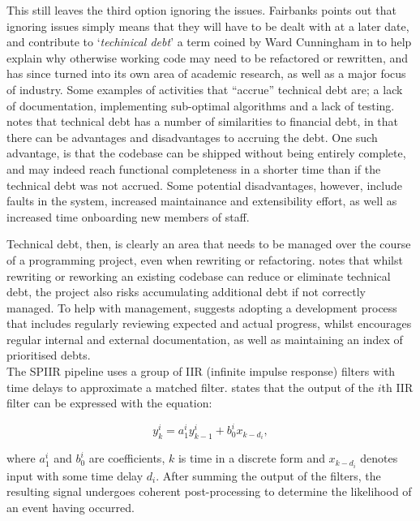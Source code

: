 \documentclass{article}
\begin{document}
This still leaves the third option \textendash{} ignoring the issues. Fairbanks points out that
ignoring issues simply means that they will have to be dealt with at a later date, and contribute to
`\textit{techinical debt}' \textendash{} a term coined by Ward Cunningham in \cite{Cunningham} to
help explain why otherwise working code may need to be refactored or rewritten, and has since turned
into its own area of academic research, as well as a major focus of industry. Some examples of
activities that ``accrue'' technical debt are; a lack of documentation, implementing sub-optimal
algorithms and a lack of testing. \cite{Allman} notes that technical debt has a number of
similarities to financial debt, in that there can be advantages and disadvantages to accruing the
debt. One such advantage, is that the codebase can be shipped without being entirely complete, and
may indeed reach functional completeness in a shorter time than if the technical debt was not
accrued. Some potential disadvantages, however, include faults in the system, increased maintainance
and extensibility effort, as well as increased time onboarding new members of staff.

Technical debt, then, is clearly an area that needs to be managed over the course of a programming
project, even when rewriting or refactoring. \cite{Fairley} notes that whilst rewriting or reworking
an existing codebase can reduce or eliminate technical debt, the project also risks accumulating
additional debt if not correctly managed. To help with management, \cite{Fairley} suggests adopting
a development process that includes regularly reviewing expected and actual progress, whilst
\cite{Allman} encourages regular internal and external documentation, as well as maintaining an
index of prioritised debts.
\\

The SPIIR pipeline uses a group of IIR (infinite impulse response) filters with time delays to
approximate a matched filter. \cite{SPIIRGPU2018} states that the output of the \(i\)th IIR filter
can be expressed with the equation:

\begin{equation}
    y^i_k = a^i_1y^i_{k-1} + b^i_0x_{k-d_i},
\end{equation}

where \(a^i_1\) and \(b^i_0\) are coefficients, \(k\) is time in a discrete form and \(x_{k-d_i}\)
denotes input with some time delay \(d_i\). After summing the output of the filters, the resulting
signal undergoes coherent post-processing to determine the likelihood of an event having occurred.
\end{document}
